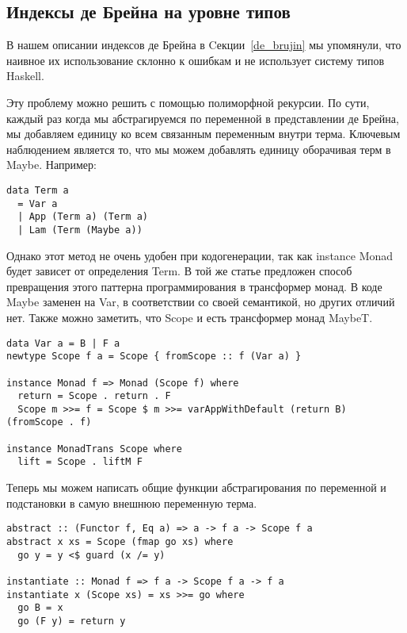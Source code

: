 \subsection{Индексы де Брейна на уровне типов}\label{de_brujin_impl}
В нашем описании индексов де Брейна в Cекции~\ref{de_brujin} мы упомянули, что наивное их использование склонно к ошибкам и не использует систему типов Haskell.


Эту проблему можно решить с помощью полиморфной рекурсии\cite{Bird:Pat}. По сути, каждый раз когда мы абстрагируемся по переменной в представлении де Брейна, мы добавляем единицу ко всем связанным переменным внутри терма. Ключевым наблюдением является то, что мы можем добавлять единицу оборачивая терм в Maybe. Например:

\begin{lstlisting}[frame=single]
data Term a
  = Var a
  | App (Term a) (Term a)
  | Lam (Term (Maybe a))
\end{lstlisting}

Однако этот метод не очень удобен при кодогенерации, так как instance Monad будет зависет от определения Term. В той же статье предложен способ превращения этого паттерна программирования в трансформер монад. В коде Maybe заменен на Var, в соответствии со своей семантикой, но других отличий нет. Также можно заметить, что Scope и есть трансформер монад MaybeT.

\begin{lstlisting}[frame=single]
data Var a = B | F a
newtype Scope f a = Scope { fromScope :: f (Var a) }

instance Monad f => Monad (Scope f) where
  return = Scope . return . F
  Scope m >>= f = Scope $ m >>= varAppWithDefault (return B) (fromScope . f)

instance MonadTrans Scope where
  lift = Scope . liftM F
\end{lstlisting}

Теперь мы можем написать общие функции абстрагирования по переменной и подстановки в самую внешнюю переменную терма.

\begin{lstlisting}[frame=single]
abstract :: (Functor f, Eq a) => a -> f a -> Scope f a
abstract x xs = Scope (fmap go xs) where
  go y = y <$ guard (x /= y)

instantiate :: Monad f => f a -> Scope f a -> f a
instantiate x (Scope xs) = xs >>= go where
  go B = x
  go (F y) = return y

\end{lstlisting}

